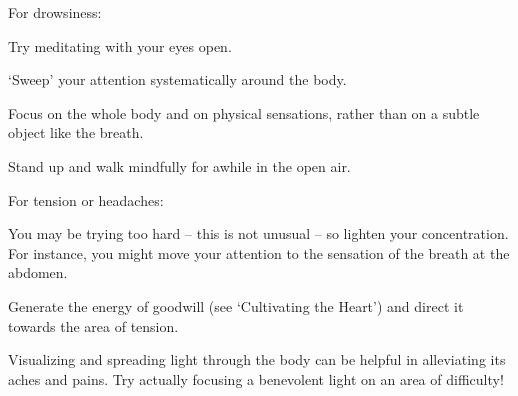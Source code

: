 \newpage

For drowsiness:
\begin{packeditemize}
\item
  Try meditating with your eyes open.
\item
  `Sweep' your attention systematically around the body.
\item
  Focus on the whole body and on physical sensations, rather than on a
  subtle object like the breath.
\item
  Stand up and walk mindfully for awhile in the open air.
\end{packeditemize}

For tension or headaches:
\begin{packeditemize}
\item
  You may be trying too hard -- this is not unusual -- so lighten your
  concentration. For instance, you might move your attention to the
  sensation of the breath at the abdomen.
\item
  Generate the energy of goodwill (see `Cultivating the Heart') and
  direct it towards the area of tension.
\item
  Visualizing and spreading light through the body can be helpful in
  alleviating its aches and pains. Try actually focusing a benevolent
  light on an area of difficulty!
\end{packeditemize}

